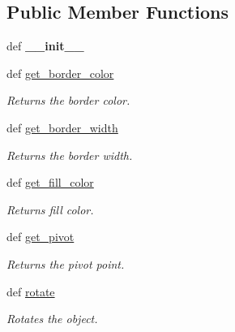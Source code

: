 \subsection*{Public Member Functions}
\begin{DoxyCompactItemize}
\item 
\hypertarget{classbroken__cs110graphics_1_1Fillable_a5a1e645baa31f285a002cba360ebb66c}{
def {\bfseries \_\-\_\-init\_\-\_\-}}
\label{classbroken__cs110graphics_1_1Fillable_a5a1e645baa31f285a002cba360ebb66c}

\item 
def \hyperlink{classbroken__cs110graphics_1_1Fillable_a7c3dcd0d73f232a957625eaba8234b3a}{get\_\-border\_\-color}
\begin{DoxyCompactList}\small\item\em Returns the border color. \item\end{DoxyCompactList}\item 
def \hyperlink{classbroken__cs110graphics_1_1Fillable_aecaa099bdf059939148239f544ffd343}{get\_\-border\_\-width}
\begin{DoxyCompactList}\small\item\em Returns the border width. \item\end{DoxyCompactList}\item 
def \hyperlink{classbroken__cs110graphics_1_1Fillable_a1bedec36e0545af2c2765c5727178e1c}{get\_\-fill\_\-color}
\begin{DoxyCompactList}\small\item\em Returns fill color. \item\end{DoxyCompactList}\item 
def \hyperlink{classbroken__cs110graphics_1_1Fillable_ad5073b750f9d2a7678aa311821b9e4d1}{get\_\-pivot}
\begin{DoxyCompactList}\small\item\em Returns the pivot point. \item\end{DoxyCompactList}\item 
def \hyperlink{classbroken__cs110graphics_1_1Fillable_a93eddaabc3656044675e6b525c903ada}{rotate}
\begin{DoxyCompactList}\small\item\em Rotates the object. \item\end{DoxyCompactList}\item 

\end{DoxyCompactItemize}
